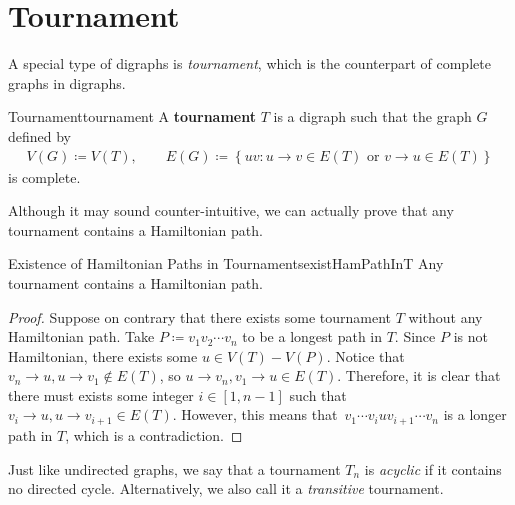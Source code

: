 \documentclass[math]{amznotes}
\theoremstyle{remark}
\newcommand{\0}{\mathbf{0}}
\newcommand{\1}{\mathbf{1}}
\begin{document}
\section{Tournament}
A special type of digraphs is \textit{tournament}, which is the counterpart of complete graphs in digraphs.
\begin{dfnbox}{Tournament}{tournament}
    A {\color{red} \textbf{tournament}} $T$ is a digraph such that the graph $G$ defined by 
    \begin{align*}
        V(G) \coloneqq V(T), \qquad E(G) \coloneqq \left\{uv \colon u \to v \in E(T) \textrm{ or } v \to u \in E(T)\right\}
    \end{align*}
    is complete.
\end{dfnbox}
Although it may sound counter-intuitive, we can actually prove that any tournament contains a Hamiltonian path.
\begin{probox}{Existence of Hamiltonian Paths in Tournaments}{existHamPathInT}
    Any tournament contains a Hamiltonian path.
    \tcblower
    \begin{proof}
        Suppose on contrary that there exists some tournament $T$ without any Hamiltonian path. Take $P \coloneqq v_1v_2\cdots v_n$ to be a longest path in $T$. Since $P$ is not Hamiltonian, there exists some $u \in V(T) - V(P)$. Notice that $v_n \to u, u \to v_1 \notin E(T)$, so $u \to v_n, v_1 \to u \in E(T)$. Therefore, it is clear that there must exists some integer $i \in [1, n - 1]$ such that $v_i \to u, u \to v_{i + 1} \in E(T)$. However, this means that~$v_1\cdots v_iuv_{i + 1}\cdots v_n$ is a longer path in $T$, which is a contradiction.
    \end{proof}
\end{probox}
Just like undirected graphs, we say that a tournament $T_n$ is \textit{acyclic} if it contains no directed cycle. Alternatively, we also call it a \textit{transitive} tournament.
\end{document}
